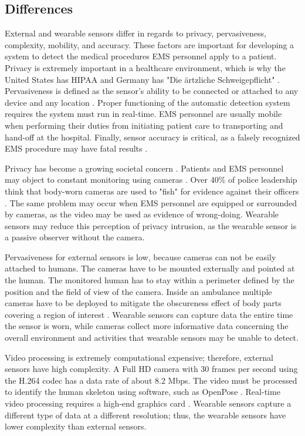 \subsection{Differences}
External and wearable sensors differ in regards to privacy, pervasiveness, complexity, mobility, and accuracy. These factors are important for developing a system to detect the medical procedures EMS personnel apply to a patient. Privacy is extremely important in a healthcare environment, which is why the United States has HIPAA \cite{HIPAA} and Germany has "Die \"artzliche Schweigepflicht" \cite{Privatgeheimnissen}. Pervasiveness is defined as the sensor's ability to be connected or attached to any device and any location \cite{Lara2013}. Proper functioning of the automatic detection system requires the system must run in real-time. EMS personnel are usually mobile when performing their duties from initiating patient care to transporting and hand-off at the hospital. Finally, sensor accuracy is critical, as a falsely recognized EMS procedure may have fatal results \cite{mourcou2015performance}.
\par Privacy has become a growing societal concern \cite{privacyindex}. Patients and EMS personnel may object to constant monitoring using cameras \cite{Arning2015}. Over 40\% of police leadership think that body-worn cameras are used to "fish" for evidence against their officers \cite{Smykla2016}. The same problem may occur when EMS personnel are equipped or surrounded by cameras, as the video may be used as evidence of wrong-doing. Wearable sensors may reduce this perception of privacy intrusion, as the wearable sensor is a passive observer without the camera.
\par Pervasiveness for external sensors is low, because cameras can not be easily attached to humans. The cameras have to be mounted externally and pointed at the human. The monitored human has to stay within a perimeter defined by the position and the field of view of the camera. Inside an ambulance multiple cameras have to be deployed to mitigate the obscureness effect of body parts covering a region of interest \cite{howe2000bayesian}. Wearable sensors can capture data the entire time the sensor is worn, while cameras collect more informative data concerning the overall environment and activities that wearable sensors may be unable to detect.
\par Video processing is extremely computational expensive; therefore, external sensors have high complexity. A Full HD camera with 30 frames per second using the H.264 codec has a data rate of about 8.2 Mbps. The video must be processed to identify the human skeleton using software, such as OpenPose \cite{openpose}. Real-time video processing requires a high-end graphics card \cite{732851}. Wearable sensors capture a different type of data at a different resolution; thus, the wearable sensors have lower complexity than external sensors.

